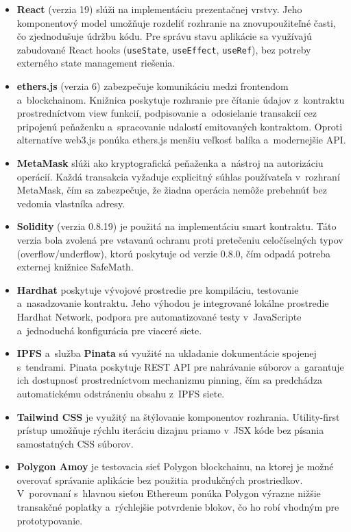 \begin{itemize}
    \item \textbf{React} (verzia 19) slúži na implementáciu prezentačnej
    vrstvy. Jeho komponentový model umožňuje rozdeliť rozhranie na
    znovupoužiteľné časti, čo zjednodušuje údržbu kódu. Pre správu stavu
    aplikácie sa využívajú zabudované React hooks (\texttt{useState},
    \texttt{useEffect}, \texttt{useRef}), bez potreby externého state
    management riešenia.

    \item \textbf{ethers.js} (verzia 6) zabezpečuje komunikáciu medzi
    frontendom a~blockchainom. Knižnica poskytuje rozhranie pre čítanie
    údajov z~kontraktu prostredníctvom view funkcií, podpisovanie
    a~odosielanie transakcií cez pripojenú peňaženku a~spracovanie
    udalostí emitovaných kontraktom. Oproti alternatíve web3.js ponúka
    ethers.js menšiu veľkosť balíka a~modernejšie API.

    \item \textbf{MetaMask} slúži ako kryptografická peňaženka a~nástroj
    na autorizáciu operácií. Každá transakcia vyžaduje explicitný súhlas
    používateľa v~rozhraní MetaMask, čím sa zabezpečuje, že žiadna operácia
    nemôže prebehnúť bez vedomia vlastníka adresy.

    \item \textbf{Solidity} (verzia 0.8.19) je použitá na implementáciu
    smart kontraktu. Táto verzia bola zvolená pre vstavanú ochranu proti
    pretečeniu celočíselných typov (overflow/underflow), ktorú poskytuje
    od verzie 0.8.0, čím odpadá potreba externej knižnice SafeMath.

    \item \textbf{Hardhat} poskytuje vývojové prostredie pre kompiláciu,
    testovanie a~nasadzovanie kontraktu. Jeho výhodou je integrované
    lokálne prostredie Hardhat Network, podpora pre automatizované testy
    v~JavaScripte a~jednoduchá konfigurácia pre viaceré siete.

    \item \textbf{IPFS} a~služba \textbf{Pinata} sú využité na ukladanie
    dokumentácie spojenej s~tendrami. Pinata poskytuje REST API pre
    nahrávanie súborov a~garantuje ich dostupnosť prostredníctvom
    mechanizmu pinning, čím sa predchádza automatickému odstráneniu
    obsahu z~IPFS siete.

    \item \textbf{Tailwind CSS} je využitý na štýlovanie komponentov
    rozhrania. Utility-first prístup umožňuje rýchlu iteráciu dizajnu
    priamo v~JSX kóde bez písania samostatných CSS súborov.

    \item \textbf{Polygon Amoy} je testovacia sieť Polygon blockchainu,
    na ktorej je možné overovať správanie aplikácie bez použitia
    produkčných prostriedkov. V~porovnaní s~hlavnou sieťou Ethereum
    ponúka Polygon výrazne nižšie transakčné poplatky a~rýchlejšie
    potvrdenie blokov, čo ho robí vhodným pre prototypovanie.
\end{itemize}

